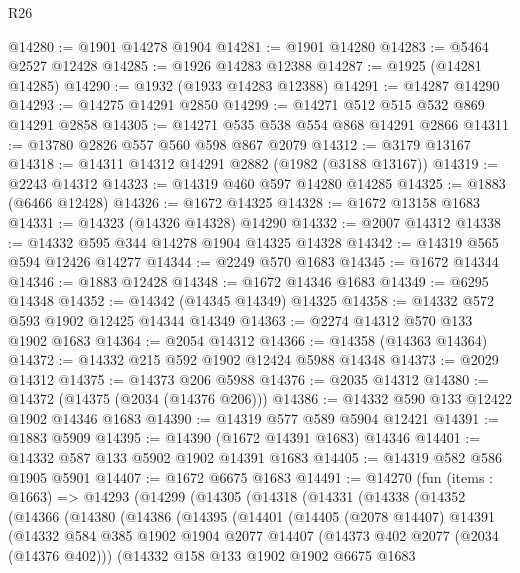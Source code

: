 \begin{lexlean}{R26}
\begin{coremodule}
@14280 := @1901 @14278 @1904
@14281 := @1901 @14280
@14283 := @5464 @2527 @12428
@14285 := @1926 @14283 @12388
@14287 := @1925 (@14281 @14285)
@14290 := @1932 (@1933 @14283 @12388)
@14291 := @14287 @14290
@14293 := @14275 @14291 @2850
@14299 := @14271 @512 @515 @532 @869 @14291 @2858
@14305 := @14271 @535 @538 @554 @868 @14291 @2866
@14311 := @13780 @2826 @557 @560 @598 @867 @2079
@14312 := @3179 @13167
@14318 := @14311 @14312 @14291 @2882 (@1982 (@3188 @13167))
@14319 := @2243 @14312
@14323 := @14319 @460 @597 @14280 @14285
@14325 := @1883 (@6466 @12428)
@14326 := @1672 @14325
@14328 := @1672 @13158 @1683
@14331 := @14323 (@14326 @14328) @14290
@14332 := @2007 @14312
@14338 := @14332 @595 @344 @14278 @1904 @14325 @14328
@14342 := @14319 @565 @594 @12426 @14277
@14344 := @2249 @570 @1683
@14345 := @1672 @14344
@14346 := @1883 @12428
@14348 := @1672 @14346 @1683
@14349 := @6295 @14348
@14352 := @14342 (@14345 @14349) @14325
@14358 := @14332 @572 @593 @1902 @12425 @14344 @14349
@14363 := @2274 @14312 @570 @133 @1902 @1683
@14364 := @2054 @14312
@14366 := @14358 (@14363 @14364)
@14372 := @14332 @215 @592 @1902 @12424 @5988 @14348
@14373 := @2029 @14312
@14375 := @14373 @206 @5988
@14376 := @2035 @14312
@14380 := @14372 (@14375 (@2034 (@14376 @206)))
@14386 := @14332 @590 @133 @12422 @1902 @14346 @1683
@14390 := @14319 @577 @589 @5904 @12421
@14391 := @1883 @5909
@14395 := @14390 (@1672 @14391 @1683) @14346
@14401 := @14332 @587 @133 @5902 @1902 @14391 @1683
@14405 := @14319 @582 @586 @1905 @5901
@14407 := @1672 @6675 @1683
@14491 := @14270
    (fun (items : @1663) =>
    @14293
      (@14299
        (@14305
          (@14318
            (@14331
              (@14338
                (@14352
                  (@14366
                    (@14380
                      (@14386
                        (@14395
                          (@14401
                            (@14405
                              (@2078 @14407)
                              @14391
                              (@14332
                                @584
                                @385
                                @1902
                                @1904
                                @2077
                                @14407
                                (@14373 @402 @2077 (@2034 (@14376 @402)))
                                (@14332
                                  @158
                                  @133
                                  @1902
                                  @1902
                                  @6675
                                  @1683

\end{coremodule}
\end{lexlean}
